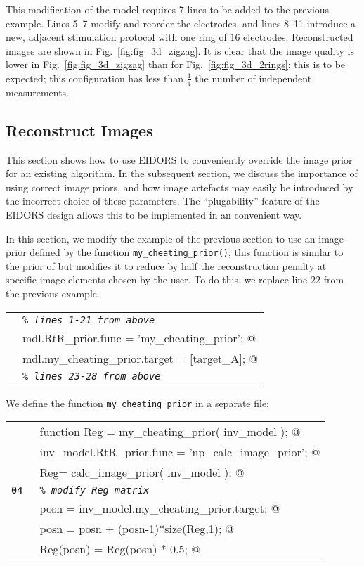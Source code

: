 \documentclass[12pt]{iopart}
\makeatletter
\newcommand{\CODEstart}{\medskip\begin{tabular}{ll}}
\newcommand{\CN}{\tt\scriptsize} %
\newcommand{\CC}{&\small\verb@}   % start code
\newcommand{\CI}{&\small\tt\em}   % start code
\newcommand{\CODEend}{\end{tabular}\medskip}
\makeatother
\begin{document}
This modification of the model requires 7 lines to be added
to the previous example. Lines 5--7 modify and reorder the
electrodes, and lines 8--11 introduce a new, adjacent
stimulation protocol with one ring of $16$ electrodes. Reconstructed
images are shown in Fig.~\ref{fig:fig_3d_zigzag}.
It is clear that the image quality is lower in Fig.~\ref{fig:fig_3d_zigzag}
than for Fig.~\ref{fig:fig_3d_2rings}; this is to be expected;
this configuration
has less than $\frac{1}{4}$ the number of independent measurements.
 

\subsection{  Reconstruct Images }

This section shows how to use EIDORS to conveniently
override the image prior
for an existing algorithm. In the subsequent section,
we discuss the importance of using correct image priors,
and how image artefacts may easily be introduced by the incorrect
choice of these parameters. The ``plugability'' feature of the
EIDORS design allows this to be implemented in an convenient way.

In this section, we modify the example of the previous section
to use an image prior defined by the function
{\tt my\_cheating\_prior()}; this function is similar to the
prior of \cite{Polydorides_2002} but modifies it to reduce
by half the reconstruction penalty at specific image elements chosen by
the user. To do this, we replace line 22 from the previous
example.

\CODEstart
\CN    \CI \% lines 1-21 from above \\[-3pt]
\CN    \CC mdl.RtR_prior.func               = 'my_cheating_prior'; @\\[-3pt]
\CN    \CC mdl.my_cheating_prior.target = [target_A]; @\\[-3pt]
\CN    \CI \% lines 23-28 from above \\[-3pt]
\CODEend

We define the function {\tt my\_cheating\_prior} in a separate file:

\CODEstart
\CN    \CC function Reg = my_cheating_prior( inv_model ); @\\[-3pt]
\CN    \CC   inv_model.RtR_prior.func = 'np_calc_image_prior'; @\\[-3pt]
\CN    \CC   Reg= calc_image_prior( inv_model ); @\\[-3pt]
\CN 04 \CI   \% modify Reg matrix \\[-3pt]
\CN    \CC   posn = inv_model.my_cheating_prior.target; @\\[-3pt]
\CN    \CC   posn = posn + (posn-1)*size(Reg,1); @\\[-3pt]
\CN    \CC   Reg(posn) = Reg(posn) * 0.5; @\\[-3pt]
\CODEend
\end{document}
